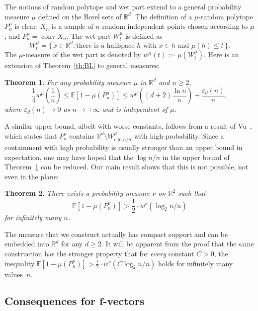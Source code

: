 \documentclass[10pt]{amsart}
\newtheorem{theo}{Theorem}[section]
\theoremstyle{definition}\newtheorem{defi}[theo]{Definition}\newtheorem{rema}[theo]{Remark}\newtheorem{exam}[theo]{Example}\newtheorem{exem}[theo]{Example}\newtheorem{nota}[theo]{Notation}
\DeclareMathOperator{\conv}{conv}
\newcommand{\Rbb}{\mathbb{R}}%
\newcommand{\Ebb}{\mathbb{E}}%
\newcommand*{\mtfrac}[2]{\frac{#1}{#2}}%
\begin{document}
The notions of random polytope and wet part extend to a general probability measure $\mu$ defined on the Borel sets of $\Rbb^d$. The definition of a $\mu$-random polytope $P_n^{\mu}$ is clear: $X_n$ is a sample of $n$ random independent points chosen according to $\mu$, and $P_n^{\mu}=\conv X_n$. The wet part $W_t^{\mu}$ is defined as
\[
W_t^{\mu}=\{\,x \in \Rbb^d: \text{there is a halfspace }h \text{ with } x \in h \text{ and }\mu (h) \le t\,\}.
\]
The $\mu$-measure of the wet part is denoted by $w^{\mu}(t):=\mu(W_t^{\mu})$. Here is an extension of Theorem~\ref{th:BL} to general measures:


\begin{theo}\label{th:BLgen}
For any probability measure $\mu$ in $\Rbb^d$ and $n \ge 2$,
\[
\frac 14 w^{\mu}\left(\mtfrac1n\right) \le \Ebb[1-\mu(P_n^\mu)] \le w^{\mu}\left({(d+2)\mtfrac{\ln n}n}\right) + \mtfrac{\varepsilon_d(n)}{n},
\]
where $\varepsilon_d(n)\to 0$ as $n\to+\infty$ and is independent of $\mu$.
\end{theo}


A similar upper bound, albeit with worse constants, follows from a result of Vu~\cite[Lemma~4.2]{VanVu}, which states that $P_n^\mu$ contains $\Rbb^d \setminus W_{c\ln n/n}^{\mu}$ with high-probability. Since a containment with high probability is usually stronger than an upper bound in expectation, one may have hoped that the $\log n/n$ in the upper bound of Theorem~\ref{th:BLgen} can be reduced. Our main result shows that this is not possible, not even in the plane:

\begin{theo}\label{th:example}
There exists a probability measure $\nu$ on $\Rbb^2$ such that
\[
\Ebb[1-\mu(P_n^\nu)] > \frac 1{2} \cdot w^\nu(\log_2 n/ n)
\]
for infinitely many $n$.
\end{theo}


The measure that we construct actually has compact support and can be embedded into $\Rbb^d$ for any $d \ge 2$. It will be apparent from the proof that the same construction has the stronger property that for \emph{every} constant $C>0$, the inequality $\Ebb[1-\mu(P_n^\nu)] > \frac 1{2} \cdot w^\nu({C \log_2 n/ n})$ holds for infinitely many values~$n$.


\subsection{Consequences for \texorpdfstring{$\mathbf{f}$}{f}-vectors}\label{f-vectors}
\end{document}
